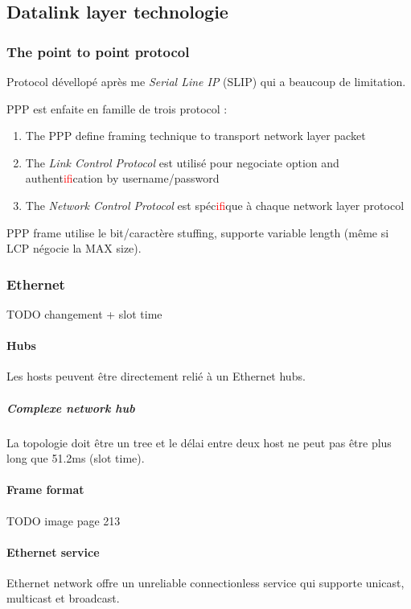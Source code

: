 \subsection{Datalink layer technologie}

\subsubsection{The point to point protocol}
Protocol dévellopé après me \textit{Serial Line IP} (SLIP) qui a beaucoup de limitation.

PPP est enfaite en famille de trois protocol :
\begin{enumerate}
    \item The PPP define framing technique to transport network layer packet
    \item The \textit{Link Control Protocol} est utilisé pour negociate option and authent\textcolor{red}{if}ication by username/password
    \item The \textit{Network Control Protocol} est spéc\textcolor{red}{if}ique à chaque network layer protocol
\end{enumerate}

PPP frame utilise le bit/caractère stuffing, supporte variable length (même si LCP négocie la MAX size).

\subsubsection{Ethernet}
TODO changement + slot time

\paragraph{Hubs}
Les hosts peuvent être directement relié à un Ethernet hubs.
\subparagraph{Complexe network hub} La topologie doit être un tree et le délai entre
deux host ne peut pas être plus long que 51.2ms (slot time).

\paragraph{Frame format}
TODO image page 213

\paragraph{Ethernet service}
Ethernet network offre un unreliable connectionless service qui supporte unicast, multicast et
broadcast.

